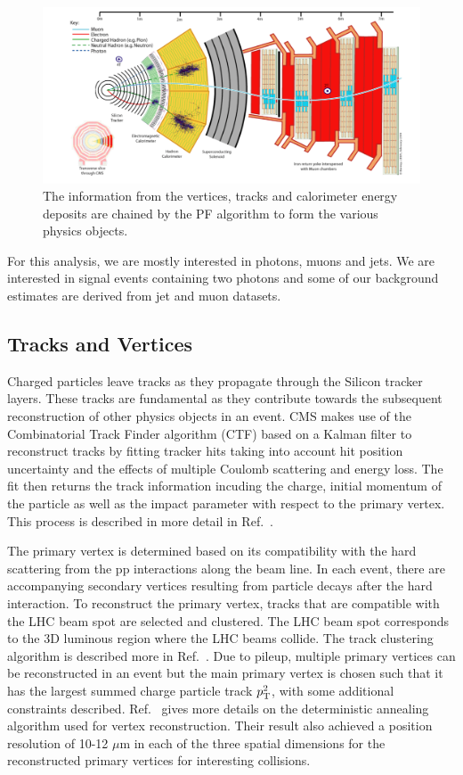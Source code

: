 \begin{figure}[!htb]
	\centering
	\includegraphics[scale=0.6]{fig/CMSParticleFlow.png}
	\caption{The information from the vertices, tracks and calorimeter energy deposits are chained by the PF algorithm to form the various physics objects.}
	\label{fig:CMSParticleFlow}
\end{figure}

For this analysis, we are mostly interested in photons, muons and jets. We are interested in signal events containing two photons and some of our background estimates are derived from jet and muon datasets. 


\subsection{Tracks and Vertices}\label{sec:track_vertex}

Charged particles leave tracks as they propagate through the Silicon tracker layers. These tracks are fundamental as they contribute towards the subsequent reconstruction of other physics objects in an event. CMS makes use of the Combinatorial Track Finder algorithm (CTF) based on a Kalman filter to reconstruct tracks by fitting tracker hits taking into account hit position uncertainty and the effects of multiple Coulomb scattering and energy loss. The fit then returns the track information incuding the charge, initial momentum of the particle as well as the impact parameter with respect to the primary vertex. This process is described in more detail in Ref.~\cite{Chatrchyan:2014fea}.

The primary vertex is determined based on its compatibility with the hard scattering from the pp interactions along the beam line. In each event, there are accompanying secondary vertices resulting from particle decays after the hard interaction. To reconstruct the primary vertex, tracks that are compatible with the LHC beam spot are selected and clustered. The LHC beam spot corresponds to the 3D luminous region where the LHC beams collide. The track clustering algorithm is described more in Ref.~\cite{Chatrchyan:2014fea}. Due to pileup, multiple primary vertices can be reconstructed in an event but the main primary vertex is chosen such that it has the largest summed charge particle track $p_{\mathrm{T}}^2$, with some additional constraints described. Ref.~\cite{CMS:2014pgm} gives more details on the deterministic annealing algorithm used for vertex reconstruction. Their result also achieved a position resolution of 10-12 $\mu$m in each of the three spatial dimensions for the reconstructed primary vertices for interesting \Pp collisions. 

